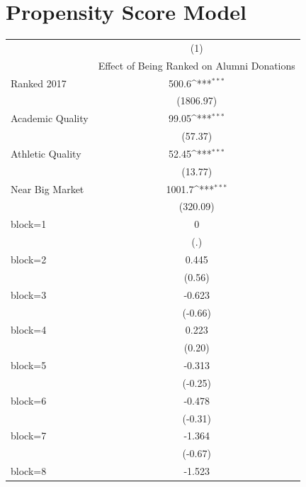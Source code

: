 \documentclass{article}
\begin{document}
\section{Propensity Score Model}
{
\def\sym#1{\ifmmode^{#1}\else\(^{#1}\)\fi}
\begin{longtable}{l*{1}{c}}
\hline\hline\endfirsthead\hline\endhead\hline\endfoot\endlastfoot
                    &\multicolumn{1}{c}{(1)}\\
                    &\multicolumn{1}{c}{Effect of Being Ranked on Alumni Donations}\\
\hline
Ranked 2017         &       500.6\sym{***}\\
                    &   (1806.97)         \\
[1em]
Academic Quality    &       99.05\sym{***}\\
                    &     (57.37)         \\
[1em]
Athletic Quality    &       52.45\sym{***}\\
                    &     (13.77)         \\
[1em]
Near Big Market     &      1001.7\sym{***}\\
                    &    (320.09)         \\
[1em]
block=1             &           0         \\
                    &         (.)         \\
[1em]
block=2             &       0.445         \\
                    &      (0.56)         \\
[1em]
block=3             &      -0.623         \\
                    &     (-0.66)         \\
[1em]
block=4             &       0.223         \\
                    &      (0.20)         \\
[1em]
block=5             &      -0.313         \\
                    &     (-0.25)         \\
[1em]
block=6             &      -0.478         \\
                    &     (-0.31)         \\
[1em]
block=7             &      -1.364         \\
                    &     (-0.67)         \\
[1em]
block=8             &      -1.523         \\

\end{longtable}}
\end{document}
